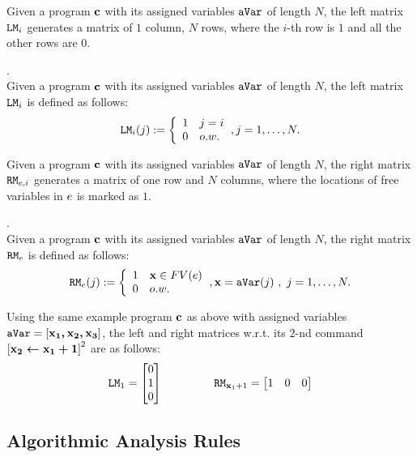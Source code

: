 \documentclass[a4paper,11pt]{article}
\begin{document}
Given a program  ${\boldsymbol{\mathbf{c}}}$ with its assigned variables $\mathtt{aVar}$ of length $N$,
the left matrix $\mathtt{LM}_i$ generates a matrix of $1$ column, $N$ rows, 
where the $i$-th row is $1$ and all the other rows are $0$.
%
\begin{defn}.
\\
Given a program  ${\boldsymbol{\mathbf{c}}}$ with its assigned variables $\mathtt{aVar}$ of length $N$, 
the left matrix $\mathtt{LM}_i$ is defined as follows:
\[
	\lMtrix_i(j) : = 
	\left
	\{
	\begin{array}{ll}
	1 & j = i \\
	0 & o.w.
	\end{array}
	\right.,
	j = 1, \ldots, N.
\]
\end{defn}
%
Given a program  ${\boldsymbol{\mathbf{c}}}$ with its assigned variables $\mathtt{aVar}$ of length $N$,
the right matrix $\mathtt{RM}_{e, i}$ generates a matrix of one row and $N$ columns, 
where the locations of free variables in $e$ is marked as $1$. 
%
%
\begin{defn}.
\\
Given a program  ${\boldsymbol{\mathbf{c}}}$ with its assigned variables $\mathtt{aVar}$ of length $N$, 
the right matrix $\mathtt{RM}_{e}$ is defined as follows:
\[
	\rMtrix_{\expr}(j) : = 
	\left\{
	\begin{array}{ll}
	1 & \ssa{x} \in FV(\expr) 
	\\
	0 & o.w.
	\end{array}
	\right.,
	\ssa{x} = \avar(j) ~ , ~ j = 1, \ldots, N.
\]
%
%
\end{defn}
%
Using the same example program ${\boldsymbol{\mathbf{c}}}$ as above with assigned variables $\mathtt{aVar} = [ {\boldsymbol{\mathbf{x_1 , x_2 , x_3}}} ] $,
the left and right matrices w.r.t. its $2$-nd command 
$\left[\ssa{\assign {x_2} {x_1 + 1}}\right]^2$  are as follows:
\[
\lMtrix_1 = \left[ \begin{matrix}
 0   \\
 1 	 \\
 0   \\
\end{matrix}   \right ] 
~~~~~~~~~~~~~~
\rMtrix_{\ssa{x}_1 + 1}
= \left[ \begin{matrix} 
   1 & 0 & 0 \\
\end{matrix}  \right]
\]
%
%
%
\subsection{Algorithmic Analysis Rules}
%
\end{document}
